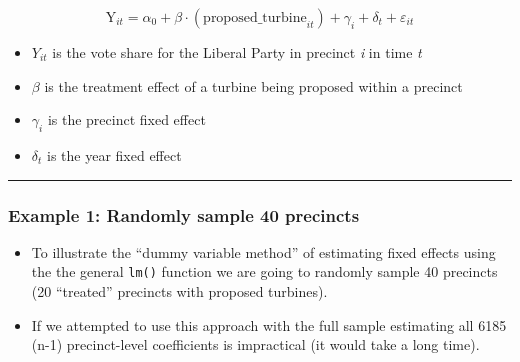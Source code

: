 \documentclass[
  letterpaper,
  DIV=11,
  numbers=noendperiod]{scrartcl}
\providecommand{\tightlist}{%
  \setlength{\itemsep}{0pt}\setlength{\parskip}{0pt}}
\begin{document}
\[
\text{Y}_{it}
=  \alpha_0 +
\beta \cdot (\text{proposed_turbine}_{it})
+ \gamma_i
+ \delta_t
+ \varepsilon_{it}
\]

\begin{itemize}
\tightlist
\item
  \(Y_{it}\) is the vote share for the Liberal Party in precinct
  \emph{i} in time \emph{t}
\item
  \(\beta\) is the treatment effect of a turbine being proposed within a
  precinct
\item
  \(\gamma_i\) is the precinct fixed effect
\item
  \(\delta_t\) is the year fixed effect
\end{itemize}

\begin{center}\rule{0.5\linewidth}{0.5pt}\end{center}

\subsubsection{Example 1: Randomly sample 40
precincts}\label{example-1-randomly-sample-40-precincts}

\begin{itemize}
\tightlist
\item
  To illustrate the ``dummy variable method'' of estimating fixed
  effects using the the general \texttt{lm()} function we are going to
  randomly sample 40 precincts (20 ``treated'' precincts with proposed
  turbines).
\item
  If we attempted to use this approach with the full sample estimating
  all 6185 (n-1) precinct-level coefficients is impractical (it would
  take a long time).
\end{itemize}
\end{document}
